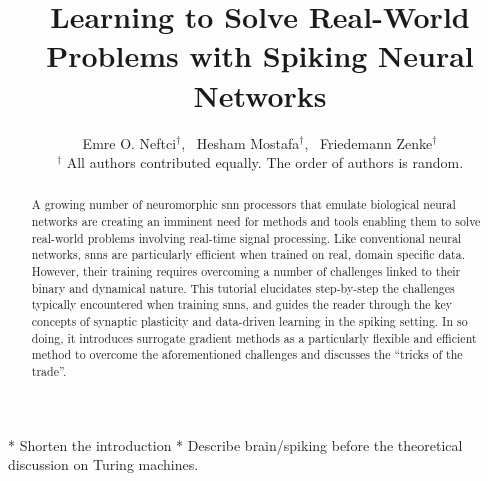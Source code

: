 \documentclass[journal,onecolumn,11pt]{IEEEtran}
\begin{document}
\title{Learning to Solve Real-World Problems with Spiking Neural Networks}

\author{Emre O. Neftci$^\dagger$,~
        Hesham Mostafa$^\dagger$,~
        Friedemann Zenke$^\dagger$\\
        {\small $^\dagger$ All authors contributed equally. The order of authors is random.}}%
%
{}
%
\maketitle
\IEEEpeerreviewmaketitle
%
\begin{abstract}
A growing number of neuromorphic \gls{snn} processors that emulate biological neural networks are creating an imminent need for methods and tools enabling them to solve real-world problems involving real-time signal processing.
Like conventional neural networks, \glspl{snn} are particularly efficient when trained on real, domain specific data. 
However, their training requires overcoming a number of challenges linked to their binary and dynamical nature.
This tutorial elucidates step-by-step the challenges typically encountered when training \glspl{snn}, and guides the reader through the key concepts of synaptic plasticity and data-driven learning in the spiking setting.
In so doing, it introduces surrogate gradient methods as a particularly flexible and efficient method to overcome the aforementioned challenges and discusses the ``tricks of the trade''. 
\end{abstract}

\begin{center}
  * Shorten the introduction
  * Describe brain/spiking before the theoretical discussion on Turing machines.
\end{center}
\end{document}
